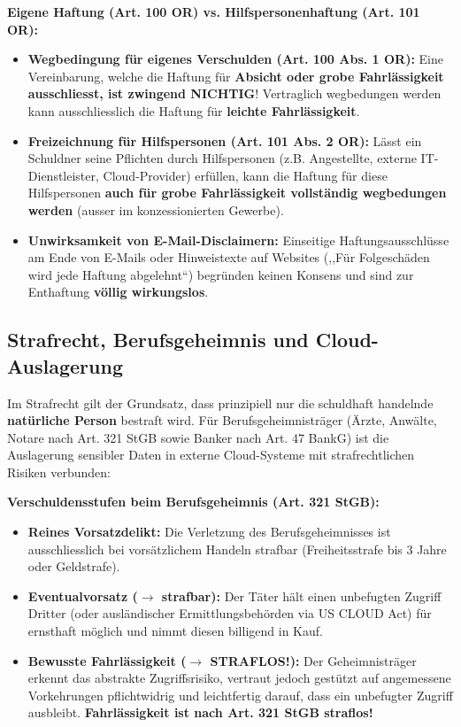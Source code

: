 \begin{theorem}
    \textbf{Eigene Haftung (Art. 100 OR) vs. Hilfspersonenhaftung (Art. 101 OR):}
    \begin{itemize}
        \item \textbf{Wegbedingung für eigenes Verschulden (Art. 100 Abs. 1 OR):} Eine Vereinbarung, welche die Haftung für \textbf{Absicht oder grobe Fahrlässigkeit ausschliesst, ist zwingend NICHTIG}! Vertraglich wegbedungen werden kann ausschliesslich die Haftung für \textbf{leichte Fahrlässigkeit}.
        \item \textbf{Freizeichnung für Hilfspersonen (Art. 101 Abs. 2 OR):} Lässt ein Schuldner seine Pflichten durch Hilfspersonen (z.B. Angestellte, externe IT-Dienstleister, Cloud-Provider) erfüllen, kann die Haftung für diese Hilfspersonen \textbf{auch für grobe Fahrlässigkeit vollständig wegbedungen werden} (ausser im konzessionierten Gewerbe).
        \item \textbf{Unwirksamkeit von E-Mail-Disclaimern:} Einseitige Haftungsausschlüsse am Ende von E-Mails oder Hinweistexte auf Websites (,,Für Folgeschäden wird jede Haftung abgelehnt``) begründen keinen Konsens und sind zur Enthaftung \textbf{völlig wirkungslos}.
    \end{itemize}
\end{theorem}

\subsection{Strafrecht, Berufsgeheimnis und Cloud-Auslagerung}

Im Strafrecht gilt der Grundsatz, dass prinzipiell nur die schuldhaft handelnde \textbf{natürliche Person} bestraft wird. Für Berufsgeheimnisträger (Ärzte, Anwälte, Notare nach Art. 321 StGB sowie Banker nach Art. 47 BankG) ist die Auslagerung sensibler Daten in externe Cloud-Systeme mit strafrechtlichen Risiken verbunden:

\begin{definition}
    \textbf{Verschuldensstufen beim Berufsgeheimnis (Art. 321 StGB):}
    \begin{itemize}
        \item \textbf{Reines Vorsatzdelikt:} Die Verletzung des Berufsgeheimnisses ist ausschliesslich bei vorsätzlichem Handeln strafbar (Freiheitsstrafe bis 3 Jahre oder Geldstrafe).
        \item \textbf{Eventualvorsatz ($\to$ strafbar):} Der Täter hält einen unbefugten Zugriff Dritter (oder ausländischer Ermittlungsbehörden via US CLOUD Act) für ernsthaft möglich und nimmt diesen billigend in Kauf.
        \item \textbf{Bewusste Fahrlässigkeit ($\to$ STRAFLOS!):} Der Geheimnisträger erkennt das abstrakte Zugriffsrisiko, vertraut jedoch gestützt auf angemessene Vorkehrungen pflichtwidrig und leichtfertig darauf, dass ein unbefugter Zugriff ausbleibt. \textbf{Fahrlässigkeit ist nach Art. 321 StGB straflos!}
    \end{itemize}
\end{definition}

